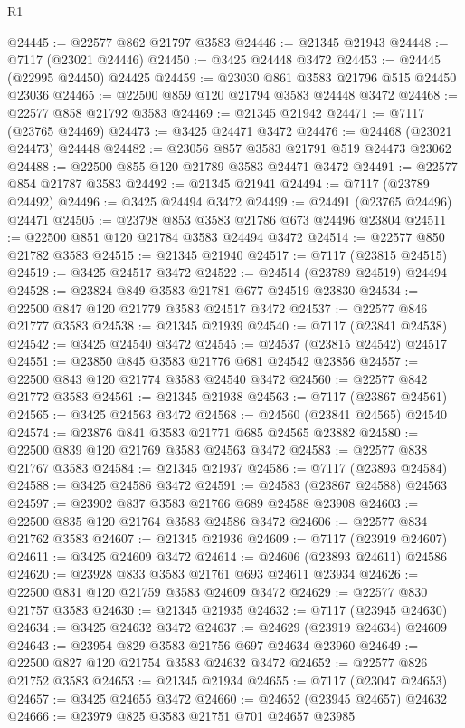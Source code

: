 \begin{lexlean}{R1}
\begin{coremodule}
@24445 := @22577 @862 @21797 @3583
@24446 := @21345 @21943
@24448 := @7117 (@23021 @24446)
@24450 := @3425 @24448 @3472
@24453 := @24445 (@22995 @24450) @24425
@24459 := @23030 @861 @3583 @21796 @515 @24450 @23036
@24465 := @22500 @859 @120 @21794 @3583 @24448 @3472
@24468 := @22577 @858 @21792 @3583
@24469 := @21345 @21942
@24471 := @7117 (@23765 @24469)
@24473 := @3425 @24471 @3472
@24476 := @24468 (@23021 @24473) @24448
@24482 := @23056 @857 @3583 @21791 @519 @24473 @23062
@24488 := @22500 @855 @120 @21789 @3583 @24471 @3472
@24491 := @22577 @854 @21787 @3583
@24492 := @21345 @21941
@24494 := @7117 (@23789 @24492)
@24496 := @3425 @24494 @3472
@24499 := @24491 (@23765 @24496) @24471
@24505 := @23798 @853 @3583 @21786 @673 @24496 @23804
@24511 := @22500 @851 @120 @21784 @3583 @24494 @3472
@24514 := @22577 @850 @21782 @3583
@24515 := @21345 @21940
@24517 := @7117 (@23815 @24515)
@24519 := @3425 @24517 @3472
@24522 := @24514 (@23789 @24519) @24494
@24528 := @23824 @849 @3583 @21781 @677 @24519 @23830
@24534 := @22500 @847 @120 @21779 @3583 @24517 @3472
@24537 := @22577 @846 @21777 @3583
@24538 := @21345 @21939
@24540 := @7117 (@23841 @24538)
@24542 := @3425 @24540 @3472
@24545 := @24537 (@23815 @24542) @24517
@24551 := @23850 @845 @3583 @21776 @681 @24542 @23856
@24557 := @22500 @843 @120 @21774 @3583 @24540 @3472
@24560 := @22577 @842 @21772 @3583
@24561 := @21345 @21938
@24563 := @7117 (@23867 @24561)
@24565 := @3425 @24563 @3472
@24568 := @24560 (@23841 @24565) @24540
@24574 := @23876 @841 @3583 @21771 @685 @24565 @23882
@24580 := @22500 @839 @120 @21769 @3583 @24563 @3472
@24583 := @22577 @838 @21767 @3583
@24584 := @21345 @21937
@24586 := @7117 (@23893 @24584)
@24588 := @3425 @24586 @3472
@24591 := @24583 (@23867 @24588) @24563
@24597 := @23902 @837 @3583 @21766 @689 @24588 @23908
@24603 := @22500 @835 @120 @21764 @3583 @24586 @3472
@24606 := @22577 @834 @21762 @3583
@24607 := @21345 @21936
@24609 := @7117 (@23919 @24607)
@24611 := @3425 @24609 @3472
@24614 := @24606 (@23893 @24611) @24586
@24620 := @23928 @833 @3583 @21761 @693 @24611 @23934
@24626 := @22500 @831 @120 @21759 @3583 @24609 @3472
@24629 := @22577 @830 @21757 @3583
@24630 := @21345 @21935
@24632 := @7117 (@23945 @24630)
@24634 := @3425 @24632 @3472
@24637 := @24629 (@23919 @24634) @24609
@24643 := @23954 @829 @3583 @21756 @697 @24634 @23960
@24649 := @22500 @827 @120 @21754 @3583 @24632 @3472
@24652 := @22577 @826 @21752 @3583
@24653 := @21345 @21934
@24655 := @7117 (@23047 @24653)
@24657 := @3425 @24655 @3472
@24660 := @24652 (@23945 @24657) @24632
@24666 := @23979 @825 @3583 @21751 @701 @24657 @23985

\end{coremodule}
\end{lexlean}
